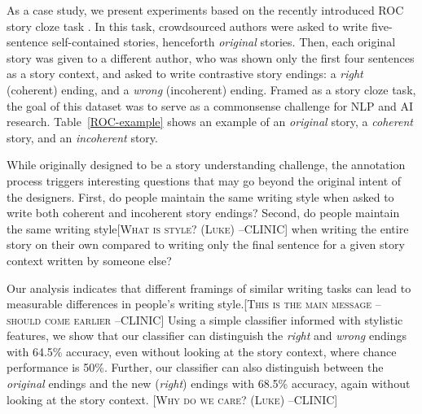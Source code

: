 \documentclass[11pt,a4paper]{article}
\newcommand{\tabref}[1]{Table~\ref{#1}}
\newcommand{\clinic}[1]{{\color{magenta}\textsc{[#1 --CLINIC]}}}
\begin{document}
As a case study, we present experiments   based on 
the recently introduced ROC story cloze task \cite{Mostafazadeh:2016}. 
In this task, crowdsourced authors were asked to write five-sentence self-contained stories, henceforth {\it original} stories.
Then, 
each original story was given to a different author, 
who was shown only the first four sentences as a story context, 
and asked to write contrastive story endings: a {\it right} (coherent) ending, and a {\it wrong} (incoherent) ending. 
Framed as a story cloze task, the goal of this dataset was to serve as
a commonsense challenge for NLP and AI research. 
\tabref{ROC-example} shows an example of an {\it original} story, a {\it coherent} story, and an {\it incoherent} story.

While originally designed to be 
a story understanding challenge, 
the annotation process  
triggers interesting questions 
that may go beyond the original intent of the designers.
First, do 
people maintain the same writing 
style when asked to write  
both coherent and incoherent story endings? Second, do people  
maintain the same writing style\clinic{What is style? (Luke)} when writing the entire story on their own compared to 
writing only the final sentence for a given story context written by someone else? 

Our analysis indicates that different framings of similar writing tasks 
can lead to measurable differences in people's writing style.\clinic{This is the main message -- should come earlier}
Using a simple classifier informed with stylistic features, we show that our classifier can distinguish the {\it right} and {\it wrong} endings with 64.5\% accuracy, even without looking at the story context, where chance performance is 50\%.
Further, our classifier can also distinguish between the {\it original} endings and the new ({\it right}) endings with 68.5\% accuracy, again without looking at the story context. \clinic{Why do we care? (Luke)}
\end{document}
